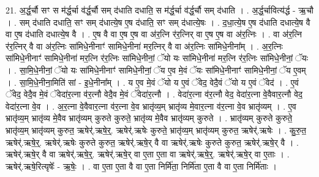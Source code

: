 \documentclass[17pt]{extarticle}
\begin{document}
21. अ॒र्द्ध॒र्चौ सꣳ स म॑र्द्ध॒र्चा व॑र्द्ध॒र्चौ सम् द॑धाति दधाति॒ स म॑र्द्ध॒र्चा व॑र्द्ध॒र्चौ सम् द॑धाति । . अ॒र्द्ध॒र्चावित्य॑र्द्ध - ऋ॒चौ । . सम् द॑धाति दधाति॒ सꣳ सम् द॑धात्ये॒ष ए॒ष द॑धाति॒ सꣳ सम् द॑धात्ये॒षः । . द॒धा॒त्ये॒ष ए॒ष द॑धाति दधात्ये॒ष वै वा ए॒ष द॑धाति दधात्ये॒ष वै । . ए॒ष वै वा ए॒ष ए॒ष वा अ॑र॒त्नि र॑र॒त्निर् वा ए॒ष ए॒ष वा अ॑र॒त्निः । . वा अ॑र॒त्नि र॑र॒त्निर् वै वा अ॑र॒त्निः सा॑मिधे॒नीनाꣳ॑ सामिधे॒नीना॑ मर॒त्निर् वै वा अ॑र॒त्निः सा॑मिधे॒नीना᳚म् । . अ॒र॒त्निः सा॑मिधे॒नीनाꣳ॑ सामिधे॒नीना॑ मर॒त्नि र॑र॒त्निः सा॑मिधे॒नीनां॒ ॅयो यः सा॑मिधे॒नीना॑ मर॒त्नि र॑र॒त्निः सा॑मिधे॒नीनां॒ ॅयः । . सा॒मि॒धे॒नीनां॒ ॅयो यः सा॑मिधे॒नीनाꣳ॑ सामिधे॒नीनां॒ ॅय ए॒व मे॒वं ॅयः सा॑मिधे॒नीनाꣳ॑ सामिधे॒नीनां॒ ॅय ए॒वम् । . सा॒मि॒धे॒नीना॒मिति॑ सां - इ॒धे॒नीना᳚म् । . य ए॒व मे॒वं ॅयो य ए॒वं ॅवेद॒ वेदै॒वं ॅयो य ए॒वं ॅवेद॑ । . ए॒वं ॅवेद॒ वेदै॒व मे॒वं ॅवेदा॑र॒त्ना व॑र॒त्नौ वेदै॒व मे॒वं ॅवेदा॑र॒त्नौ । . वेदा॑र॒त्ना व॑र॒त्नौ वेद॒ वेदा॑र॒त्ना वे॒वैवार॒त्नौ वेद॒ वेदा॑र॒त्ना वे॒व । . अ॒र॒त्ना वे॒वैवार॒त्ना व॑र॒त्ना वे॒व भ्रातृ॑व्य॒म् भ्रातृ॑व्य मे॒वार॒त्ना व॑र॒त्ना वे॒व भ्रातृ॑व्यम् । . ए॒व भ्रातृ॑व्य॒म् भ्रातृ॑व्य मे॒वैव भ्रातृ॑व्यम् कुरुते कुरुते॒ भ्रातृ॑व्य मे॒वैव भ्रातृ॑व्यम् कुरुते । . भ्रातृ॑व्यम् कुरुते कुरुते॒ भ्रातृ॑व्य॒म् भ्रातृ॑व्यम् कुरुत॒ ऋषेर्॑.ऋषे॒र्॒. ऋषेर्॑.ऋषेः कुरुते॒ भ्रातृ॑व्य॒म् भ्रातृ॑व्यम् कुरुत॒ ऋषेर्॑.ऋषेः । . कु॒रु॒त॒ ऋषेर्॑.ऋषे॒र्॒. ऋषेर्॑.ऋषेः कुरुते कुरुत॒ ऋषेर्॑.ऋषे॒र् वै वा ऋषेर्॑.ऋषेः कुरुते कुरुत॒ ऋषेर्॑.ऋषे॒र् वै । . ऋषेर्॑.ऋषे॒र् वै वा ऋषेर्॑.ऋषे॒र्॒. ऋषेर्॑.ऋषे॒र् वा ए॒ता ए॒ता वा ऋषेर्॑.ऋषे॒र्॒. ऋषेर्॑.ऋषे॒र् वा ए॒ताः । . ऋषेर्॑.ऋषे॒रित्यृषेः᳚ - ऋ॒षेः॒ । . वा ए॒ता ए॒ता वै वा ए॒ता निर्मि॑ता॒ निर्मि॑ता ए॒ता वै वा ए॒ता निर्मि॑ताः । \newline
\end{document}
